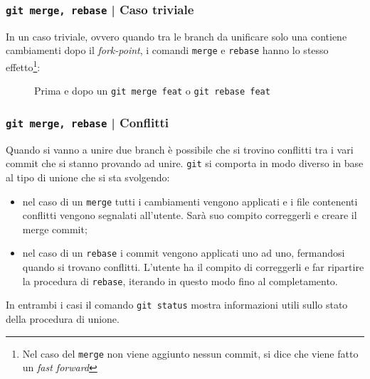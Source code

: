 \documentclass{beamer}
\begin{document}
\begin{frame}
  \label{trivial}
  \frametitle{\texttt{git merge, rebase} | Caso triviale}
  In un caso triviale, ovvero quando tra le branch da unificare solo una contiene
  cambiamenti dopo il \emph{fork-point}, i comandi \texttt{merge} e \texttt{rebase}
  hanno lo stesso effetto\footnote{Nel caso del \texttt{merge} non viene
  aggiunto nessun commit, si dice che viene fatto un \emph{fast forward}}:
  \begin{figure}
    \centering
    \quad
    \caption{Prima e dopo un \texttt{git merge feat} o \texttt{git rebase feat}}
  \end{figure}
\end{frame}

\begin{frame}
  \label{conflict}
  \frametitle{\texttt{git merge, rebase} | Conflitti}
  Quando si vanno a unire due branch \`e possibile che si trovino conflitti tra
  i vari commit che si stanno provando ad unire. \texttt{git} si comporta in
  modo diverso in base al tipo di unione che si sta svolgendo:
  \begin{itemize}
    \item<1-> nel caso di un \texttt{merge} tutti i cambiamenti vengono
      applicati e i file contenenti conflitti vengono segnalati all'utente.
      Sar\`a suo compito correggerli e creare il merge commit;
    \item<2-> nel caso di un \texttt{rebase} i commit vengono applicati uno ad
      uno, fermandosi quando si trovano conflitti. L'utente ha il compito di
      correggerli e far ripartire la procedura di \texttt{rebase}, iterando
      in questo modo fino al completamento.
  \end{itemize}
  In entrambi i casi il comando \texttt{git status} mostra informazioni utili
  sullo stato della procedura di unione.
\end{frame}
\end{document}
